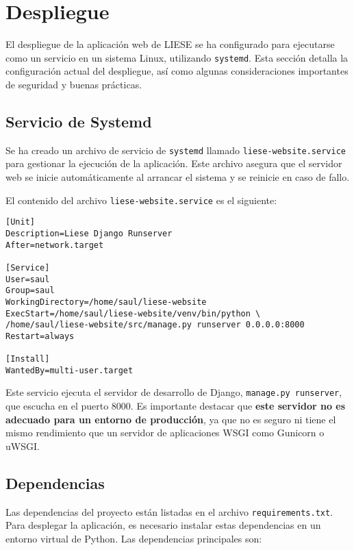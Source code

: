 \chapter{Despliegue} 
\label{ch:despliegue}

El despliegue de la aplicación web de LIESE se ha configurado para ejecutarse como un servicio en un sistema Linux, utilizando \texttt{systemd}. Esta sección detalla la configuración actual del despliegue, así como algunas consideraciones importantes de seguridad y buenas prácticas.

\section{Servicio de Systemd}

Se ha creado un archivo de servicio de \texttt{systemd} llamado \texttt{liese-website.service} para gestionar la ejecución de la aplicación. Este archivo asegura que el servidor web se inicie automáticamente al arrancar el sistema y se reinicie en caso de fallo.

El contenido del archivo \texttt{liese-website.service} es el siguiente:

\begin{verbatim}
[Unit]
Description=Liese Django Runserver
After=network.target

[Service]
User=saul
Group=saul
WorkingDirectory=/home/saul/liese-website
ExecStart=/home/saul/liese-website/venv/bin/python \
/home/saul/liese-website/src/manage.py runserver 0.0.0.0:8000
Restart=always

[Install]
WantedBy=multi-user.target
\end{verbatim}

Este servicio ejecuta el servidor de desarrollo de Django, \texttt{manage.py runserver}, que escucha en el puerto 8000. Es importante destacar que \textbf{este servidor no es adecuado para un entorno de producción}, ya que no es seguro ni tiene el mismo rendimiento que un servidor de aplicaciones WSGI como Gunicorn o uWSGI.

\section{Dependencias}

Las dependencias del proyecto están listadas en el archivo \texttt{requirements.txt}. Para desplegar la aplicación, es necesario instalar estas dependencias en un entorno virtual de Python. Las dependencias principales son:

